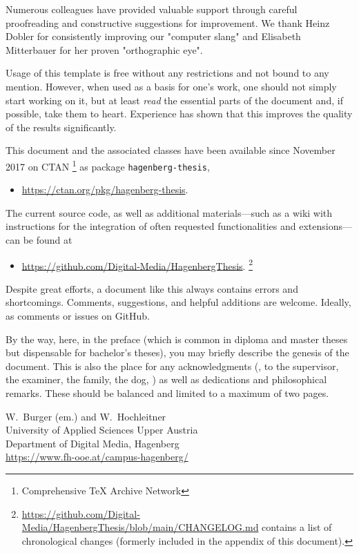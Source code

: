 Numerous colleagues have provided valuable support through careful proofreading
and constructive suggestions for improvement. We thank Heinz Dobler for
consistently improving our "computer slang" and Elisabeth Mitterbauer for her
proven "orthographic eye".

Usage of this template is free without any restrictions and not bound to any
mention. However, when used as a basis for one's work, one should not simply
start working on it, but at least \emph{read} the essential parts of the
document and, if possible, take them to heart. Experience has shown that this
improves the quality of the results significantly.

This document and the associated \latex classes have been available since
November 2017 on CTAN%
\footnote{Comprehensive TeX Archive Network} 
as package \texttt{hagenberg-thesis},
%
\begin{itemize}
	\item[]\url{https://ctan.org/pkg/hagenberg-thesis}.
\end{itemize}
%
The current source code, as well as additional materials---such as a wiki with
instructions for the integration of often requested functionalities and
extensions---can be found at
%
\begin{itemize}
  \item[]\url{https://github.com/Digital-Media/HagenbergThesis}.%
  \footnote{\url{https://github.com/Digital-Media/HagenbergThesis/blob/main/CHANGELOG.md}
  contains a list of chronological changes (formerly included in the appendix
  of this document).}
\end{itemize}

\noindent
Despite great efforts, a document like this always contains errors and
shortcomings. Comments, suggestions, and helpful additions are welcome.
Ideally, as comments or issues on GitHub.

By the way, here, in the preface (which is common in diploma and master theses
but dispensable for bachelor's theses), you may briefly describe the genesis of
the document. This is also the place for any acknowledgments (\eg, to the
supervisor, the examiner, the family, the dog, \etc) as well as dedications and
philosophical remarks. These should be balanced and limited to a maximum of two
pages.

\vspace{6ex}
\noindent
W.\ Burger (em.) and W.\ Hochleitner\\[1ex]
University of Applied Sciences Upper Austria\\ 
Department of Digital Media, Hagenberg\\
\url{https://www.fh-ooe.at/campus-hagenberg/}
